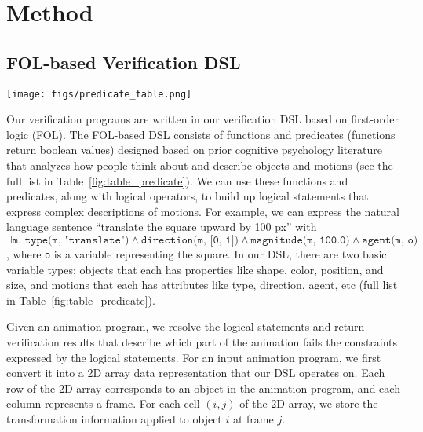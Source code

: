 \section{Method}


\subsection{FOL-based Verification DSL}
\begin{figure*}[t]
    \centering
    \texttt{[image: figs/predicate\_table.png]}
    \caption{
        Our first-order logic DSL 
    }
    \label{fig:table_predicate}
\end{figure*}

Our verification programs are written in our verification DSL based on first-order logic (FOL).
The FOL-based DSL consists of functions and predicates (functions return boolean values) designed based on prior cognitive psychology literature that analyzes how people think about and describe objects and motions (see the full list in Table~\ref{fig:table_predicate}).
We can use these functions and predicates, along with logical operators, to build up logical statements that express complex descriptions of motions.
For example, we can express the natural language sentence ``translate the square upward by 100 px'' with $\exists \texttt{m. type(m, "translate")} \land \texttt{direction(m, [0, 1])} \land \texttt{magnitude(m, 100.0)} \land \texttt{agent(m, o)}$, where \texttt{o} is a variable representing the square.
%
In our DSL, there are two basic variable types: objects that each has properties like shape, color, position, and size, and motions that each has attributes like type, direction, agent, etc (full list in Table~\ref{fig:table_predicate}).

Given an animation program, we resolve the logical statements and return verification results that describe which part of the animation fails the constraints expressed by the logical statements.
%
For an input animation program, we first convert it into a 2D array data representation that our DSL operates on.
Each row of the 2D array corresponds to an object in the animation program, and each column represents a frame.
For each cell $(i,j)$ of the 2D array, we store the transformation information applied to object $i$ at frame $j$.

